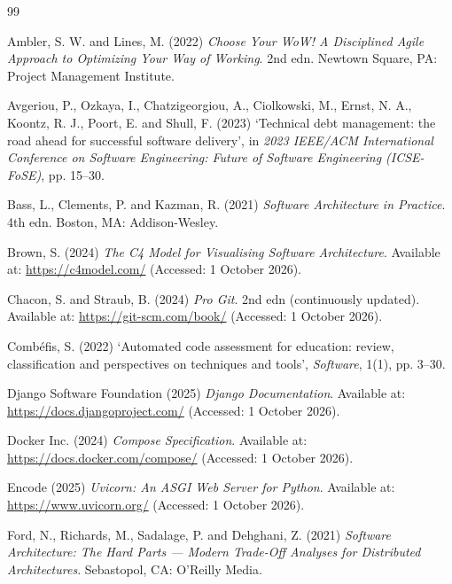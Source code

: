 \documentclass[a4paper,11pt]{article}
\begin{document}
\begin{thebibliography}{99}
\setlength{\itemsep}{4pt}
\small

Ambler, S. W. and Lines, M. (2022) \textit{Choose Your WoW! A Disciplined Agile
Approach to Optimizing Your Way of Working}. 2nd edn. Newtown Square, PA:
Project Management Institute.

Avgeriou, P., Ozkaya, I., Chatzigeorgiou, A., Ciolkowski, M., Ernst, N. A.,
Koontz, R. J., Poort, E. and Shull, F. (2023) `Technical debt management: the
road ahead for successful software delivery', in \textit{2023 IEEE/ACM
International Conference on Software Engineering: Future of Software Engineering
(ICSE-FoSE)}, pp. 15--30.

Bass, L., Clements, P. and Kazman, R. (2021) \textit{Software Architecture in
Practice}. 4th edn. Boston, MA: Addison-Wesley.

Brown, S. (2024) \textit{The C4 Model for Visualising Software Architecture}.
Available at: \url{https://c4model.com/} (Accessed: 1 October 2026).

Chacon, S. and Straub, B. (2024) \textit{Pro Git}. 2nd edn (continuously
updated). Available at: \url{https://git-scm.com/book/} (Accessed: 1 October 2026).

Comb\'{e}fis, S. (2022) `Automated code assessment for education: review,
classification and perspectives on techniques and tools', \textit{Software},
1(1), pp. 3--30.

Django Software Foundation (2025) \textit{Django Documentation}. Available at:
\url{https://docs.djangoproject.com/} (Accessed: 1 October 2026).

Docker Inc. (2024) \textit{Compose Specification}. Available at:
\url{https://docs.docker.com/compose/} (Accessed: 1 October 2026).

Encode (2025) \textit{Uvicorn: An ASGI Web Server for Python}. Available at:
\url{https://www.uvicorn.org/} (Accessed: 1 October 2026).

Ford, N., Richards, M., Sadalage, P. and Dehghani, Z. (2021) \textit{Software
Architecture: The Hard Parts --- Modern Trade-Off Analyses for Distributed
Architectures}. Sebastopol, CA: O'Reilly Media.


\end{thebibliography}
\end{document}
